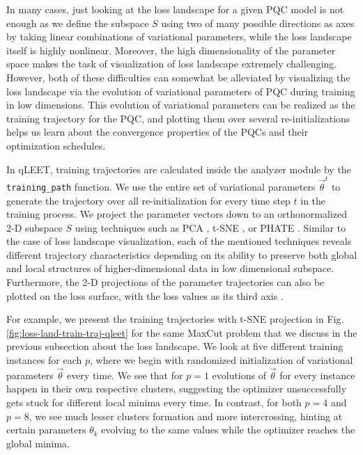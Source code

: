 In many cases, just looking at the loss landscape for a given PQC model is not enough as we define the subspace $S$ using two of many possible directions as axes by taking linear combinations of variational parameters, while the loss landscape itself is highly nonlinear. Moreover, the high dimensionality of the parameter space makes the task of visualization of loss landscape extremely challenging. However, both of these difficulties can somewhat be alleviated by visualizing the loss landscape via the evolution of variational parameters of PQC during training in low dimensions. This evolution of variational parameters can be realized as the training trajectory for the PQC, and plotting them over several re-initializations helps us learn about the convergence properties of the PQCs and their optimization schedules. 

In qLEET, training trajectories are calculated inside the analyzer module by the \texttt{training\_path} function. We use the entire set of variational parameters $\vec{\theta}^{t}$ to generate the trajectory over all re-initialization for every time step $t$ in the training process. We project the parameter vectors down to an orthonormalized 2-D subspace $S$ using techniques such as PCA \cite{Jolliffe2016}, t-SNE \cite{NIPS2002_6150ccc6}, or PHATE \cite{Moon2019}. Similar to the case of loss landscape visualization, each of the mentioned techniques reveals different trajectory characteristics depending on its ability to preserve both global and local structures of higher-dimensional data in low dimensional subspace. Furthermore, the 2-D projections of the parameter trajectories can also be plotted on the loss surface, with the loss values as its third axis \cite{training-trajectories}.

For example, we present the training trajectories with t-SNE projection in Fig. \ref{fig:loss-land-train-traj-qleet} for the same MaxCut problem that we discuss in the previous subsection about the loss landscape. We look at five different training instances for each $p$, where we begin with randomized initialization of variational parameters $\vec{\theta}$ every time. We see that for $p=1$ evolutions of $\vec{\theta}$ for every instance happen in their own respective clusters, suggesting the optimizer unsuccessfully gets stuck for different local minima every time. In contrast, for both $p=4$ and $p=8$, we see much lesser clusters formation and more intercrossing, hinting at certain parameters $\theta_k$ evolving to the same values while the optimizer reaches the global minima.

